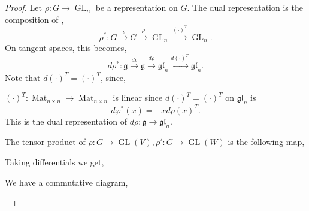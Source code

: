 \documentclass[10pt]{article}
\numberwithin{equation}{theorem}
\DeclareMathOperator{\GL}{GL}
\DeclareMathOperator{\Mat}{Mat}
\newcommand{\g}[0]{\mathfrak{g}}
\newcommand{\gl}[0]{\mathfrak{gl}}
\begin{document}
\begin{proof}
  Let $\rho:G\to \GL_n$ be a representation on $G$. The dual representation is the composition of ,
  \begin{equation*}
    \rho^*:G\stackrel{\iota}{\to}G\stackrel{\rho}{\to}\GL_n\stackrel{(\cdot)^T}{\to}\GL_n.
  \end{equation*}
  On tangent spaces, this becomes, 
  \begin{equation*}
    d\rho^*:\g\stackrel{d\iota}{\to}\g\stackrel{d\rho}{\to}\gl_n\stackrel{d(\cdot)^T}{\to}\gl_n.
  \end{equation*}
  Note that $d(\cdot)^T=(\cdot)^T$, since,
  \begin{center}
  \end{center}
  $(\cdot)^T:\Mat_{n\times n}\to\Mat_{n\times n}$ is linear since $d(\cdot)^T = (\cdot)^T$ on $\gl_n$ is 
  \begin{equation*}
    d\varphi^*(x) = -xd\rho(x)^T.
  \end{equation*}
  This is the dual representation of $d\rho:\g\to\gl_n$.\\
  \par The tensor product of $\rho:G\to\GL(V),\rho':G\to\GL(W)$ is the following map,
  \begin{center}
  \end{center}
  Taking differentials we get,
  \begin{center}
  \end{center}
  We have a commutative diagram,
  \begin{center}

\end{center}
\end{proof}
\end{document}
